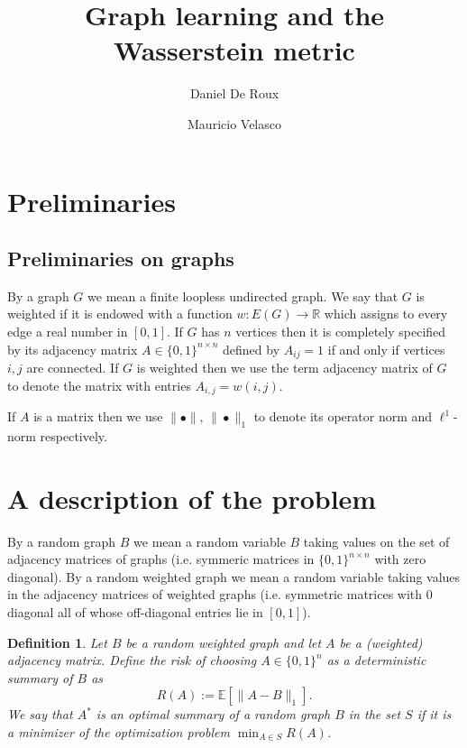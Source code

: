 \documentclass[12pt]{amsart}
\title{Graph learning and the Wasserstein metric}
\author{Daniel De Roux}
\author{Mauricio Velasco}
\newtheorem{definition}[lemma]{Definition}
\theoremstyle{remark}
\newcommand{\EE}{\mathbb{E}}
\newcommand{\RR}{\mathbb{R}}
\begin{document}
\maketitle


\section{Preliminaries}


\subsection{ Preliminaries on graphs}

By a graph $G$ we mean a finite loopless undirected graph. We say that $G$ is weighted if it is endowed with a function $w: E(G)\rightarrow \RR$ which assigns to every edge a real number in $[0,1]$. If $G$ has $n$ vertices then it is completely specified by its adjacency matrix $A\in \{0,1\}^{n\times n}$ defined by $A_{ij}=1$ if and only if vertices $i,j$ are connected. If $G$ is weighted then we use the term adjacency matrix of $G$ to denote the matrix with entries $A_{i,j}=w(i,j)$. 

If $A$ is a matrix then we use $\|\bullet\|$, $\|\bullet\|_1$ to denote its operator norm and $\ell^1$-norm respectively.

\section{A description of the problem}

By a random graph $B$ we mean a random variable $B$ taking values on the set of adjacency matrices of graphs (i.e. symmeric matrices in $\{0,1\}^{n\times n}$ with zero diagonal). By a random weighted graph we mean a random variable taking values in the adjacency matrices of weighted graphs (i.e. symmetric matrices with $0$ diagonal all of whose off-diagonal entries lie in $[0,1]$). 

\begin{definition} Let $B$ be a random weighted graph and let $A$ be a (weighted) adjacency matrix. Define the risk of choosing $A\in \{0,1\}^n$ as a deterministic summary of $B$ as
\[R(A):=\EE[\|A-B\|_1].\]
We say that $A^*$ is an optimal summary of a random graph $B$ in the set $S$ if it is a minimizer of the optimization problem $\min_{A\in S} R(A)$.
\end{definition}
\end{document}
